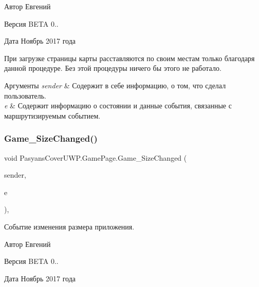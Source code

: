 \begin{DoxyAuthor}{Автор}
Евгений 
\end{DoxyAuthor}
\begin{DoxyVersion}{Версия}
B\+E\+TA 0.. 
\end{DoxyVersion}
\begin{DoxyDate}{Дата}
Ноябрь 2017 года
\end{DoxyDate}
При загрузке страницы карты расставляются по своим местам только благодаря данной процедуре. Без этой процедуры ничего бы этого не работало. 
\begin{DoxyParams}{Аргументы}
{\em sender} & Содержит в себе информацию, о том, что сделал пользователь. \\
\hline
{\em e} & Содержит информацию о состоянии и данные события, связанные с маршрутизируемым событием. \\
\hline
\end{DoxyParams}
\mbox{\label{class_pasyans_cover_u_w_p_1_1_game_page_a062bef918b47d0786b00d1f1738fdfa8}} 
\subsubsection{\texorpdfstring{Game\+\_\+\+Size\+Changed()}{Game\_SizeChanged()}}
{\footnotesize\ttfamily void Pasyans\+Cover\+U\+W\+P.\+Game\+Page.\+Game\+\_\+\+Size\+Changed (\begin{DoxyParamCaption}\item[{object}]{sender,  }\item[{Size\+Changed\+Event\+Args}]{e }\end{DoxyParamCaption})\hspace{0.3cm}{\ttfamily [inline]}, {\ttfamily [private]}}



Событие изменения размера приложения. 

\begin{DoxyAuthor}{Автор}
Евгений 
\end{DoxyAuthor}
\begin{DoxyVersion}{Версия}
B\+E\+TA 0.. 
\end{DoxyVersion}
\begin{DoxyDate}{Дата}
Ноябрь 2017 года 
\end{DoxyDate}

